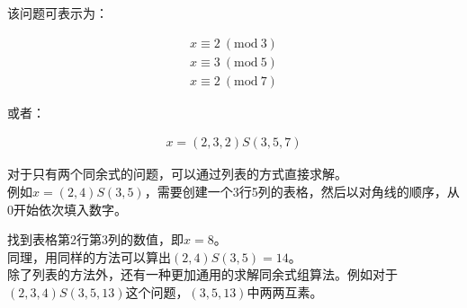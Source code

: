 该问题可表示为：

\vspace{-1cm}

\begin{align*}
    x \equiv 2\ (\text{mod}\ 3) \\
    x \equiv 3\ (\text{mod}\ 5) \\
    x \equiv 2\ (\text{mod}\ 7)
\end{align*}

或者：

\vspace{-1cm}

\begin{align*}
    x = (2, 3, 2)S(3, 5, 7)
\end{align*}

对于只有两个同余式的问题，可以通过列表的方式直接求解。\\

例如$ x = (2, 4)S(3, 5) $，需要创建一个3行5列的表格，然后以对角线的顺序，从0开始依次填入数字。

\begin{table}[H]
    \centering
\end{table}

找到表格第2行第3列的数值，即$ x = 8 $。\\

同理，用同样的方法可以算出$ (2, 4)S(3, 5) = 14 $。\\

除了列表的方法外，还有一种更加通用的求解同余式组算法。例如对于$ (2, 3, 4)S(3, 5, 13) $这个问题，$ (3, 5, 13) $中两两互素。\\

